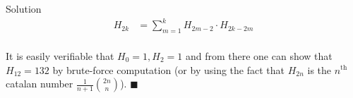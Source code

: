 \documentclass{article}
\begin{document}
\begin{solution}{Solution}
\[
\begin{aligned}
H_{2k} &= \sum_{m=1}^k H_{2m - 2} \cdot H_{2k - 2m} \\
\end{aligned}
\]

It is easily verifiable that $H_0 = 1, H_2 = 1$ and from there one can
show that $H_12 = 132$ by brute-force computation (or by using the fact
that $H_{2n}$ is the $n^\text{th}$ catalan number $
\frac{1}{n+1} \binom{2n}{n}$). $\blacksquare$

\end{solution}
\end{document}

